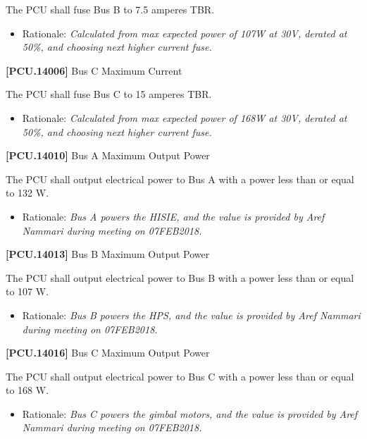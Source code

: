 The \gls{PCU} shall fuse Bus B to 7.5 amperes TBR\label{tbx_6}.

\begin{itemize}
\item{} Rationale: \emph{Calculated from max expected power of 107W at 30V, derated at 50\%, and choosing next higher current fuse.}

\end{itemize}

\textbf{[PCU.14006]} Bus C Maximum Current

The \gls{PCU} shall fuse Bus C to 15 amperes TBR\label{tbx_7}.

\begin{itemize}
\item{} Rationale: \emph{Calculated from max expected power of 168W at 30V, derated at 50\%, and choosing next higher current fuse.}

\end{itemize}

\textbf{[PCU.14010]} Bus A Maximum Output Power

The \gls{PCU} shall output electrical power to Bus A with a power less than or equal to 132 W.

\begin{itemize}
\item{} Rationale: \emph{Bus A powers the HISIE, and the value is provided by Aref Nammari during meeting on 07FEB2018.}

\end{itemize}

\textbf{[PCU.14013]} Bus B Maximum Output Power

The \gls{PCU} shall output electrical power to Bus B with a power less than or equal to 107 W.

\begin{itemize}
\item{} Rationale: \emph{Bus B powers the HPS, and the value is provided by Aref Nammari during meeting on 07FEB2018.}

\end{itemize}

\textbf{[PCU.14016]} Bus C Maximum Output Power

The \gls{PCU} shall output electrical power to Bus C with a power less than or equal to 168 W.

\begin{itemize}
\item{} Rationale: \emph{Bus C powers the gimbal motors, and the value is provided by Aref Nammari during meeting on 07FEB2018.}

\end{itemize}

